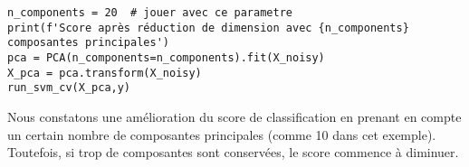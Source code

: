 \documentclass[a4paper,12pt]{article}
\begin{document}
\begin{verbatim}
n_components = 20  # jouer avec ce parametre
print(f'Score après réduction de dimension avec {n_components} composantes principales')
pca = PCA(n_components=n_components).fit(X_noisy)
X_pca = pca.transform(X_noisy)
run_svm_cv(X_pca,y)
\end{verbatim}

Nous constatons une amélioration du score de classification en prenant en compte un certain nombre de composantes principales (comme 10 dans cet exemple). Toutefois, si trop de composantes sont conservées, le score commence à diminuer.
\end{document}
